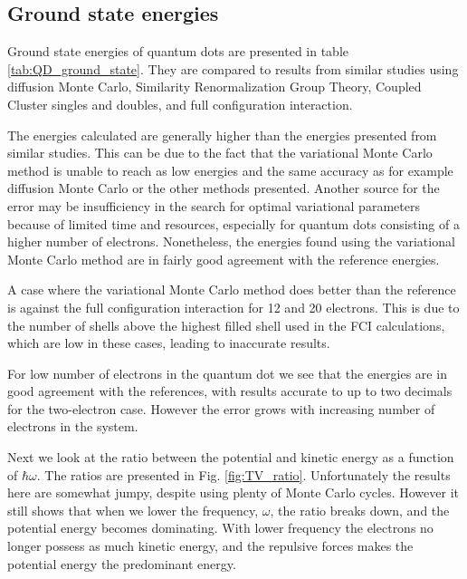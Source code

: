 \subsection{Ground state energies}
	
	Ground state energies of quantum dots are presented in table \ref{tab:QD_ground_state}. They are compared to results from similar studies using diffusion Monte Carlo, Similarity Renormalization Group Theory, Coupled Cluster singles and doubles, and full configuration interaction.

	The energies calculated are generally higher than the energies presented from similar studies. This can be due to the fact that the variational Monte Carlo method is unable to reach as low energies and the same accuracy as for example diffusion Monte Carlo or the other methods presented. Another source for the error may be insufficiency in the search for optimal variational parameters because of limited time and resources, especially for quantum dots consisting of a higher number of electrons. Nonetheless, the energies found using the variational Monte Carlo method are in fairly good agreement with the reference energies.  

	A case where the variational Monte Carlo method does better than the reference is against the full configuration interaction for 12 and 20 electrons. This is due to the number of shells above the highest filled shell used in the FCI calculations, which are low in these cases, leading to inaccurate results.

	For low number of electrons in the quantum dot we see that the energies are in good agreement with the references, with results accurate to up to two decimals for the two-electron case. However the error grows with increasing number of electrons in the system. 


	Next we look at the ratio between the potential and kinetic energy as a function of $\hbar\omega$. The ratios are presented in Fig. \ref{fig:TV_ratio}. Unfortunately the results here are somewhat jumpy, despite using plenty of Monte Carlo cycles. However it still shows that when we lower the frequency, $\omega$, the ratio breaks down, and the potential energy becomes dominating. With lower frequency the electrons no longer possess as much kinetic energy, and the repulsive forces makes the potential energy the predominant energy.  

	
